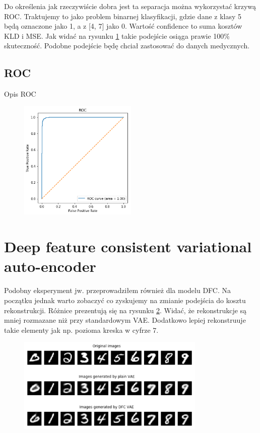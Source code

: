 Do określenia jak rzeczywiście dobra jest ta separacja można wykorzystać krzywą ROC. Traktujemy to jako problem binarnej klasyfikacji, gdzie dane z klasy 5 będą oznaczone jako 1, a z [4, 7] jako 0. Wartość confidence to suma kosztów KLD i MSE. Jak widać na rysunku \ref{fig:mnist_roc} takie podejście osiąga prawie 100\% skuteczność. Podobne podejście będę chciał zastosować do danych medycznych.

\subsection{ROC}

Opis ROC

\begin{figure}[h!]
    \centering
    \includegraphics[width=0.5\textwidth]{images/mnist_roc}
    \caption{}
    \label{fig:mnist_roc}
\end{figure}

\section{Deep feature consistent variational auto-encoder}

Podobny eksperyment jw. przeprowadziłem również dla modelu DFC. Na początku jednak warto zobaczyć co zyskujemy na zmianie podejścia do kosztu rekonstrukcji. Różnice prezentują się na rysunku \ref{fig:vae_dfc_recon}. Widać, że rekonstrukcje są mniej rozmazane niż przy standardowym VAE. Dodatkowo lepiej rekonstruuje takie elementy jak np. pozioma kreska w cyfrze 7. 

\begin{figure}[h!]
    \centering
    \includegraphics[width=0.8\textwidth]{images/vae_dfc_gen}
    \caption{}
    \label{fig:vae_dfc_recon}
\end{figure}

